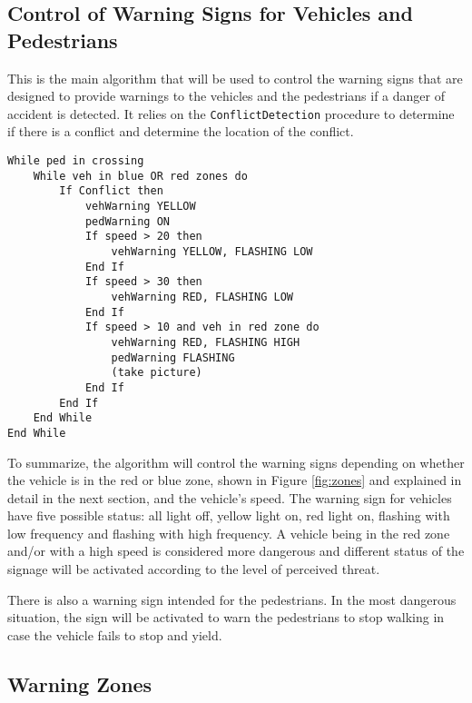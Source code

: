 \documentclass{article}
\begin{document}

\subsection{Control of Warning Signs for Vehicles and Pedestrians}
This is the main algorithm that will be used to control the warning signs that are designed to provide warnings to the vehicles and the pedestrians if a danger of accident is detected. It relies on the \texttt{ConflictDetection} procedure to determine if there is a conflict and determine the location of the conflict.
\begin{verbatim}
While ped in crossing
    While veh in blue OR red zones do
        If Conflict then
            vehWarning YELLOW
            pedWarning ON
            If speed > 20 then
                vehWarning YELLOW, FLASHING LOW
            End If
            If speed > 30 then
                vehWarning RED, FLASHING LOW
            End If
            If speed > 10 and veh in red zone do
                vehWarning RED, FLASHING HIGH
                pedWarning FLASHING
                (take picture)
            End If
        End If
    End While
End While
\end{verbatim}

To summarize, the algorithm will control the warning signs depending on whether the vehicle is in the red or blue zone, shown in Figure \ref{fig:zones} and explained in detail in the next section, and the vehicle's speed. The warning sign for vehicles have five possible status: all light off, yellow light on, red light on, flashing with low frequency and flashing with high frequency. A vehicle being in the red zone and/or with a high speed is considered more dangerous and different status of the signage will be activated according to the level of perceived threat.

There is also a warning sign intended for the pedestrians. In the most dangerous situation, the sign will be activated to warn the pedestrians to stop walking in case the vehicle fails to stop and yield.

\subsection{Warning Zones}
\end{document}
